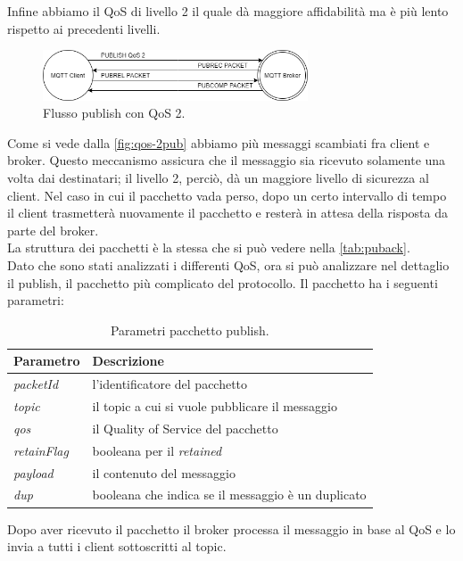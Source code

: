 \documentclass[binding=0.6cm,TFA]{sapthesis}
\begin{document}
\begin{large}
Infine abbiamo il QoS di livello 2 il quale dà maggiore affidabilità ma è più lento rispetto ai precedenti livelli.

\begin{figure}[h]
\centering
\includegraphics[width=0.7\textwidth]{images/publish-qos2.png}
\caption{Flusso publish con QoS 2.}
\label{fig:qos-2pub}
\end{figure}

Come si vede dalla \autoref{fig:qos-2pub} abbiamo più messaggi scambiati fra client e broker. Questo meccanismo assicura che il messaggio sia ricevuto solamente una volta dai destinatari; il livello 2, perciò, dà un maggiore livello di sicurezza al client.
Nel caso in cui il pacchetto vada perso, dopo un certo intervallo di tempo il client trasmetterà nuovamente il pacchetto e resterà in attesa della risposta da parte del broker. \\
La struttura dei pacchetti è la stessa che si può vedere nella \autoref{tab:puback}. \\

Dato che sono stati analizzati i differenti QoS, ora si può analizzare nel dettaglio il publish, il pacchetto più complicato del protocollo.
Il pacchetto ha i seguenti parametri:
\begin{table}[h]
\caption{Parametri pacchetto publish.}
\label{tab:publish}
\begin{tabular}{lp{}}
\toprule
\textbf{Parametro} & \textbf{Descrizione} \\
\midrule
\textit{packetId} & l'identificatore del pacchetto \\
\textit{topic} & il topic a cui si vuole pubblicare il messaggio \\
\textit{qos} & il Quality of Service del pacchetto \\
\textit{retainFlag} & booleana per il \textit{retained} \\
\textit{payload} & il contenuto del messaggio \\
\textit{dup} & booleana che indica se il messaggio è un duplicato \\
\bottomrule
\end{tabular}
\end{table}

Dopo aver ricevuto il pacchetto il broker processa il messaggio in base al QoS e lo invia a tutti i client sottoscritti al topic.


\end{large}
\end{document}
